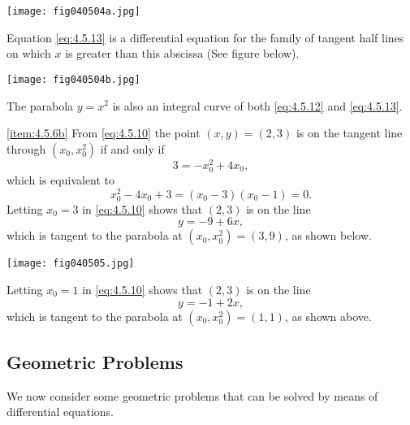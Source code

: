 \documentclass{ximera}
\begin{document}
\begin{example}
\begin{explanation}
\begin{image}
  \texttt{[image: fig040504a.jpg]}
\end{image}
 
Equation \eqref{eq:4.5.13} is a
differential
equation for the family of tangent half lines on which $x$ is greater
than this abscissa (See figure below).
 
\begin{image}
  \texttt{[image: fig040504b.jpg]}
\end{image}
 
The
parabola $y=x^2$ is also an integral curve of both \eqref{eq:4.5.12} and
\eqref{eq:4.5.13}.
 
\ref{item:4.5.6b}
From \eqref{eq:4.5.10} the point $(x,y)=(2,3)$ is on the tangent line
through $(x_0,x_0^2)$ if and only if
$$
3=-x_0^2+4x_0,
$$
which is equivalent to
$$
x_0^2-4x_0+3=(x_0-3)(x_0-1)=0.
$$
Letting $x_0=3$ in \eqref{eq:4.5.10} shows that $(2,3)$ is on the line
$$
y=-9+6x,
$$
which is tangent to the parabola at $(x_0,x_0^2)=(3,9)$, as shown below.
 
\begin{image}
  \texttt{[image: fig040505.jpg]}
\end{image}
 
 
Letting $x_0=1$ in \eqref{eq:4.5.10} shows that $(2,3)$ is on the line
$$
y=-1+2x,
$$
which is tangent to the parabola at $(x_0,x_0^2)=(1,1)$, as shown above.
\end{explanation}
\end{example}
 
 
\subsection*{Geometric Problems}
 
We now consider some geometric problems that can be solved by means of
differential equations.
 
\end{document}
